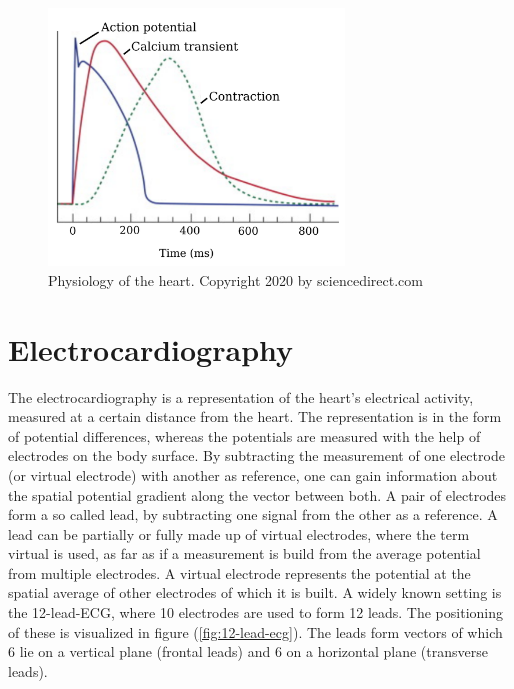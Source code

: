 
% 


\begin{figure}[ht]
    \center
    \includegraphics[width=0.7\textwidth]{figures/caradio_excitation.png}
	\caption{Physiology of the heart. Copyright 2020 by sciencedirect.com}
	\label{fig:cardiac_excitation}
\end{figure}

\section{Electrocardiography}
The electrocardiography is a representation of the heart's electrical activity, measured at a certain distance from the heart. The representation is in the form of potential differences, whereas the potentials are measured with the help of electrodes on the body surface. By subtracting the measurement of one electrode (or virtual electrode) with another as reference, one can gain information about the spatial potential gradient along the vector between both.
A pair of electrodes form a so called lead, by subtracting one signal from the other as a reference. A lead can be partially or fully made up of virtual electrodes, where the term virtual is used, as far as if a measurement is build from the average potential from multiple electrodes. A virtual electrode represents the potential at the spatial average of other electrodes of which it is built.
A widely known setting is the 12-lead-ECG, where 10 electrodes are used to form 12 leads. The positioning of these is visualized in figure (\ref{fig:12-lead-ecg}). The leads form vectors of which 6 lie on a vertical plane (frontal leads) and 6 on a horizontal plane (transverse leads).

